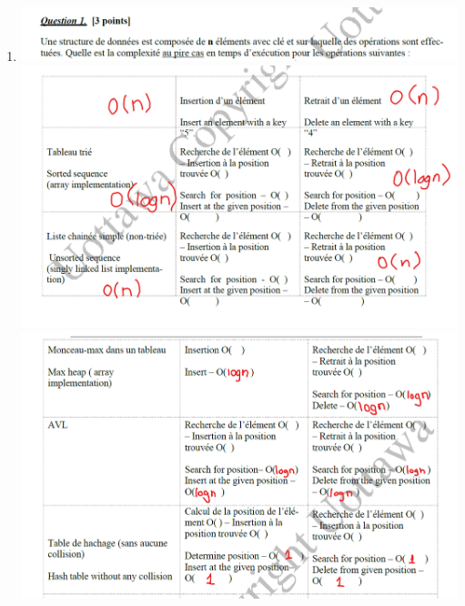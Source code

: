 \documentclass[12pt]{book}
\begin{document}
\newcommand{\reporttitle}{Devoir 7}
\newcommand{\reportauthorOne}{Kien Do}
\newcommand{\cidOne}{300163370}





\begin{enumerate}
    
    \item
    
    \includegraphics[scale=0.69]{d7q1q.png}\\
    \includegraphics[scale=0.69]{d7q1a1.png}\\
    \includegraphics[scale=0.69]{d7q1a2.png}\\
    

\end{enumerate}
\end{document}
